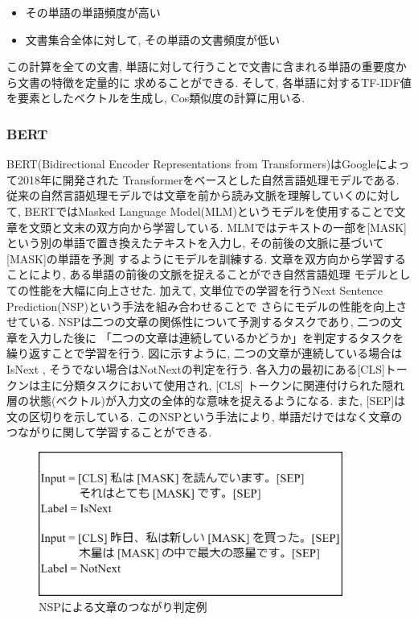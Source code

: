 \documentclass{ltjarticle}
\begin{document}
\begin{itemize}
    \item その単語の単語頻度が高い
    \item 文書集合全体に対して, その単語の文書頻度が低い
\end{itemize}
\vspace{5truept}

\noindent
この計算を全ての文書, 単語に対して行うことで文書に含まれる単語の重要度から文書の特徴を定量的に
求めることができる. そして, 各単語に対するTF-IDF値を要素としたベクトルを生成し, Cos類似度の計算に用いる. 

\subsubsection{BERT}
BERT(Bidirectional Encoder Representations from Transformers)はGoogleによって2018年に開発された
Transformerをベースとした自然言語処理モデルである. 従来の自然言語処理モデルでは文章を前から読み文脈を理解していくのに対して, 
BERTではMasked Language Model(MLM)というモデルを使用することで文章を文頭と文末の双方向から学習している. 
MLMではテキストの一部を[MASK]という別の単語で置き換えたテキストを入力し, その前後の文脈に基づいて[MASK]の単語を予測
するようにモデルを訓練する. 文章を双方向から学習することにより, ある単語の前後の文脈を捉えることができ自然言語処理
モデルとしての性能を大幅に向上させた. 加えて, 文単位での学習を行うNext Sentence Prediction(NSP)という手法を組み合わせることで
さらにモデルの性能を向上させている. NSPは二つの文章の関係性について予測するタスクであり, 二つの文章を入力した後に
「二つの文章は連続しているかどうか」を判定するタスクを繰り返すことで学習を行う. 図に示すように, 二つの文章が連続している場合はIsNext
, そうでない場合はNotNextの判定を行う. 各入力の最初にある[CLS]トークンは主に分類タスクにおいて使用され, [CLS]
トークンに関連付けられた隠れ層の状態(ベクトル)が入力文の全体的な意味を捉えるようになる. また, [SEP]は文の区切りを示している. 
このNSPという手法により, 単語だけではなく文章のつながりに関して学習することができる. 
\vspace{10truept}

\begin{figure}[ht]
    \centering
    \includegraphics[width=10cm]{images/BERT.drawio.png}
    \caption{NSPによる文章のつながり判定例}
    \label{fig:BERT}
\end{figure}
\newpage
\end{document}
